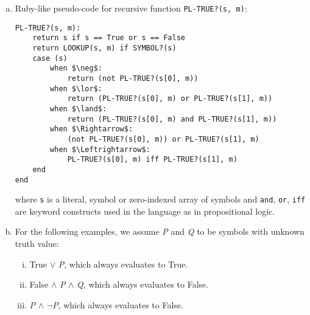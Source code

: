 \documentclass{scrartcl}
\begin{document}
\begin{enumerate}[(a)]
    \item Ruby-like pseudo-code for recursive function \verb|PL-TRUE?(s, m)|:
\begin{lstlisting}
PL-TRUE?(s, m):
    return s if s == True or s == False
    return LOOKUP(s, m) if SYMBOL?(s)
    case (s)
        when $\neg$:
            return (not PL-TRUE?(s[0], m))
        when $\lor$:
            return (PL-TRUE?(s[0], m) or PL-TRUE?(s[1], m))
        when $\land$:
            return (PL-TRUE?(s[0], m) and PL-TRUE?(s[1], m))
        when $\Rightarrow$:
            (not PL-TRUE?(s[0], m)) or PL-TRUE?(s[1], m)
        when $\Leftrightarrow$:
            PL-TRUE?(s[0], m) iff PL-TRUE?(s[1], m)
    end
end
\end{lstlisting}
        where \verb|s| is a literal, symbol or zero-indexed array of symbols and \verb|and|,
        \verb|or|, \verb|iff| are keyword constructs used in the language as in propositional logic.
    \item For the following examples, we assume \emph{P} and \emph{Q} to be symbols with unknown
        truth value:
        \begin{enumerate}[(i)]
            \item True $\lor$ \emph{P}, which always evaluates to True.
            \item False $\land$ \emph{P} $\land$ \emph{Q}, which always evaluates to False.
            \item \emph{P} $\land$ $\neg$\emph{P}, which always evaluates to False.
        \end{enumerate}
\end{enumerate}
\end{document}
